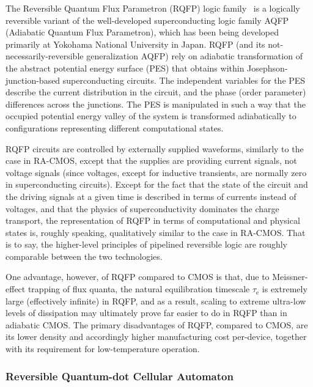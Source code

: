 \documentclass[preprints,article,accept,moreauthors,pdftex]{Definitions/mdpi}
\begin{document}
\begin{paracol}{2}
The Reversible Quantum Flux Parametron (RQFP) logic family~\cite{TYY14,TYY18,YTY19} is a logically reversible variant of the well-developed superconducting logic family AQFP (Adiabatic Quantum Flux Parametron), which has been being developed primarily at Yokohama National University in Japan. RQFP (and its not-necessarily-reversible generalization AQFP) rely on adiabatic transformation of the abstract potential energy surface (PES) that obtains within Josephson-junction-based superconducting circuits. The independent variables for the PES describe the current distribution in the circuit, and the phase (order parameter) differences across the junctions. The PES is manipulated in such a way that the occupied potential energy valley of the system is transformed adiabatically to configurations representing different computational states. 

RQFP circuits are controlled by externally supplied waveforms, similarly to the case in RA-CMOS, except that the supplies are providing current signals, not voltage signals (since voltages, except for inductive transients, are normally zero in superconducting circuits). Except for the fact that the state of the circuit and the driving signals at a given time is described in terms of currents instead of voltages, and that the physics of superconductivity dominates the charge transport, the representation of RQFP in terms of computational and physical states is, roughly speaking, qualitatively similar to the case in RA-CMOS. That is to say, the higher-level principles of pipelined reversible logic are roughly comparable between the two technologies. 

One advantage, however, of RQFP compared to CMOS is that, due to Meissner-effect trapping of flux quanta, the natural equilibration timescale $\tau_\mathrm{e}$ is extremely large (effectively infinite) in RQFP, and as a result, scaling to extreme ultra-low levels of dissipation may ultimately prove far easier to do in RQFP than in adiabatic CMOS. The primary disadvantages of RQFP, compared to CMOS, are its lower density and accordingly higher manufacturing cost per-device, together with its requirement for low-temperature operation.

\subsubsection{Reversible Quantum-dot Cellular Automaton}
\label{sssec:r-qca}


\end{paracol}
\end{document}
